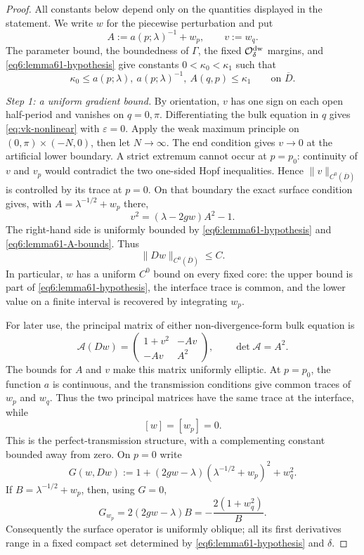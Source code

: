 \documentclass[11pt,reqno]{amsart}
\numberwithin{equation}{section}
\theoremstyle{definition}
\theoremstyle{remark}
\begin{document}
\begin{proof}
All constants below depend only on the quantities displayed in the
statement.  We write $w$ for the piecewise perturbation and put
\[
 A:=a(p;\lambda)^{-1}+w_p,
 \qquad v:=w_q.
\]
The parameter bound, the boundedness of $\Gamma$, the fixed
$\mathcal O_\delta^{\rm dw}$ margins, and
\eqref{eq6:lemma61-hypothesis} give constants
$0<\kappa_0<\kappa_1$ such that
\begin{equation}\label{eq6:lemma61-A-bounds}
 \kappa_0\le a(p;\lambda),\ a(p;\lambda)^{-1},\ A(q,p)
 \le\kappa_1
 \qquad\text{on }\overline D.
\end{equation}

\smallskip
\noindent\emph{Step 1: a uniform gradient bound.}
By orientation, $v$ has one sign on each open half-period and
vanishes on $q=0,\pi$.  Differentiating the bulk equation in $q$
gives \eqref{eq:vk-nonlinear} with $\varepsilon=0$.  Apply the weak
maximum principle on
$(0,\pi)\times(-N,0)$, then let $N\to\infty$.  The end condition gives
$v\to0$ at the artificial lower boundary.  A strict extremum cannot
occur at $p=p_0$: continuity of $v$ and $v_p$ would contradict the
two one-sided Hopf inequalities.  Hence $\|v\|_{C^0(\overline D)}$
is controlled by its trace at $p=0$.  On that boundary the exact
surface condition gives, with $A=\lambda^{-1/2}+w_p$ there,
\[
 v^2=(\lambda-2gw)A^2-1.
\]
The right-hand side is uniformly bounded by
\eqref{eq6:lemma61-hypothesis} and
\eqref{eq6:lemma61-A-bounds}.  Thus
\begin{equation}\label{eq6:lemma61-gradient}
 \|Dw\|_{C^0(\overline D)}\le C.
\end{equation}
In particular, $w$ has a uniform $C^0$ bound on every fixed core:
the upper bound is part of \eqref{eq6:lemma61-hypothesis}, the
interface trace is common, and the lower value on a finite interval
is recovered by integrating $w_p$.

For later use, the principal matrix of either non-divergence-form
bulk equation is
\[
 \mathcal A(Dw)=
 \begin{pmatrix}
  1+v^2&-Av\\
  -Av&A^2
 \end{pmatrix},
 \qquad \det\mathcal A=A^2.
\]
The bounds for $A$ and $v$ make this matrix uniformly elliptic.  At
$p=p_0$, the function $a$ is continuous, and the transmission
conditions give common traces of $w_p$ and $w_q$.  Thus the two
principal matrices have the same trace at the interface, while
\[
 [w]=[w_p]=0.
\]
This is the perfect-transmission structure, with a complementing
constant bounded away from zero.  On $p=0$ write
\[
 G(w,Dw):=1+(2gw-\lambda)(\lambda^{-1/2}+w_p)^2+w_q^2.
\]
If $B=\lambda^{-1/2}+w_p$, then, using $G=0$,
\[
 G_{w_p}=2(2gw-\lambda)B
 =-\frac{2(1+w_q^2)}{B}.
\]
Consequently the surface operator is uniformly oblique; all its
first derivatives range in a fixed compact set determined by
\eqref{eq6:lemma61-hypothesis} and $\delta$.


\end{proof}
\end{document}
